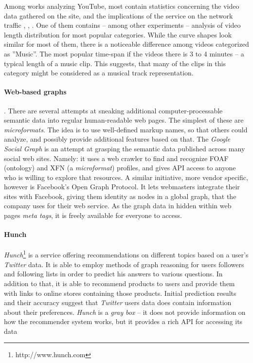 Among works analyzing YouTube, most contain statistics concerning the video
data gathered on the site, and the implications of the service on the network
traffic \cite{i-tube-you-tube}, \cite{views-from-the-edge},
\cite{statistics-and-social-network}. One of them
\cite{statistics-and-social-network} contains -- among other experiments --
analysis of video length distribution for most popular categories.  While the
curve shapes look similar for most of them, there is a noticeable difference
among videos categorized as ''Music''. The most popular time-span if the videos
there is 3 to 4 minutes -- a typical length of a music clip. This suggests,
that many of the clips in this category might be considered as a musical track
representation.

\paragraph{Web-based graphs}. There are several attempts at sneaking additional
computer-processable semantic data into regular human-readable web pages.  The
simplest of these are \textit{microformats}. The idea is to use well-defined
markup names, so that others could analyze, and possibly provide additional
features based on that.  The \textit{Google Social Graph} is an attempt at grasping
the semantic data published across many social web sites. Namely: it uses a web
crawler to find and recognize FOAF (ontology) and XFN (a \textit{microformat}) profiles,
and gives API access to anyone who is willing to explore that resources. A
similar initiative, more vendor specific, however is Facebook's Open Graph
Protocol. It lets webmasters integrate their sites with Facebook, giving them
identity as nodes in a global graph, that the company uses for their
web service. As the graph data in hidden within web pages \textit{meta tags},
it is freely available for everyone to access.

\paragraph{Hunch}
\textit{Hunch}\footnote{http://www.hunch.com} is a service offering recommendations on different topics based on a user's
\textit{Twitter} data. It is able to employ methods of graph reasoning for users followers and following lists
in order to predict his answers to various questions. In addition to that, it is able to recommend products
to users and provide them with links to online stores containing those products.
Initial prediction results and their accuracy suggest that
\textit{Twitter} users data does contain information about their preferences. \textit{Hunch} is a \textit{gray box}
--  it does not provide information on how the recommender system works, but it provides a rich
API for accessing its data
